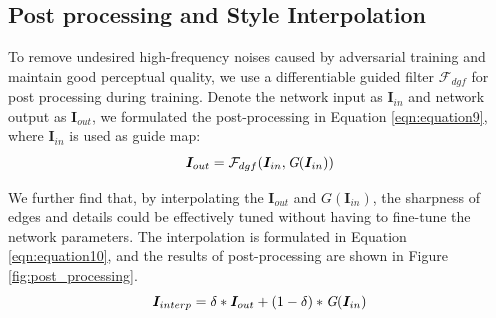 \documentclass[10pt,twocolumn,letterpaper]{article}
\begin{document}
\subsection{Post processing and Style Interpolation}
\vspace{-0.3em}
To remove undesired high-frequency noises caused by adversarial training and maintain good perceptual quality, we use a differentiable guided filter $\mathcal{F}_{dgf}$ for post processing during training. Denote the network input as $\bm{I}_{in}$ and network output as $\bm{I}_{out}$, we formulated the post-processing in Equation \ref{eqn:equation9}, where $\bm{I}_{in}$ is used as guide map:
\begin{equation}
\vspace{-0.2em}
\bm{I}_{out} = \mathcal{F}_{dgf}(\bm{I}_{in}, \textit{G}(\bm{I}_{in}))
\label{eqn:equation9}
\vspace{-0.2em}
\end{equation}

We further find that, by interpolating the $\bm{I}_{out}$ and $\textit{G}(\bm{I}_{in})$, the sharpness of edges and details could be effectively tuned without having to fine-tune the network parameters. The interpolation is formulated in Equation \ref{eqn:equation10}, and the results of post-processing are shown in Figure \ref{fig:post_processing}.
\begin{equation}
\vspace{-0.5em}
\bm{I}_{interp} = \delta*\bm{I}_{out} + (1-\delta) * \textit{G}(\bm{I}_{in})
\label{eqn:equation10}
\vspace{-0.5em}
\end{equation}
\end{document}

